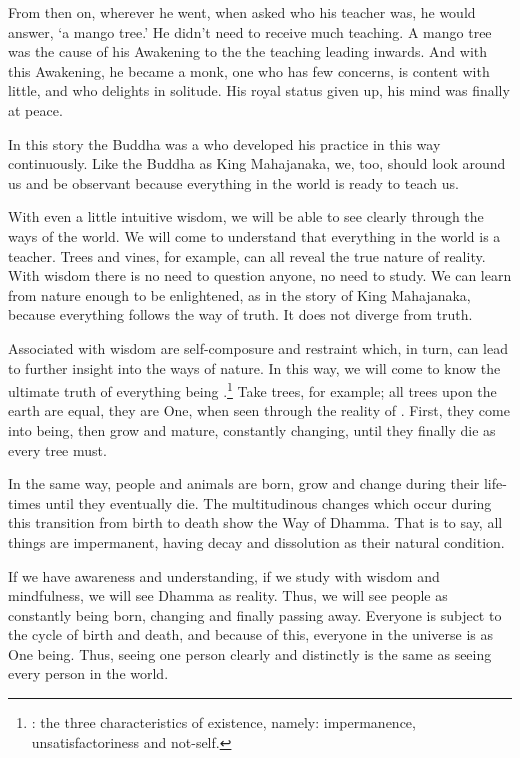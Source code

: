 From then on, wherever he went, when asked who his teacher was, he would answer, `a mango tree.' He didn't need to receive much teaching. A mango tree was the cause of his Awakening to the  the teaching leading inwards. And with this Awakening, he became a monk, one who has few concerns, is content with little, and who delights in solitude. His royal status given up, his mind was finally at peace. 

In this story the Buddha was a  who developed his practice in this way continuously. Like the Buddha as King Mahajanaka, we, too, should look around us and be observant because everything in the world is ready to teach us. 

With even a little intuitive wisdom, we will be able to see clearly through the ways of the world. We will come to understand that everything in the world is a teacher. Trees and vines, for example, can all reveal the true nature of reality. With wisdom there is no need to question anyone, no need to study. We can learn from nature enough to be enlightened, as in the story of King Mahajanaka, because everything follows the way of truth. It does not diverge from truth. 

Associated with wisdom are self-composure and restraint which, in turn, can lead to further insight into the ways of nature. In this way, we will come to know the ultimate truth of everything being .\footnote{: the three characteristics of existence, namely: impermanence, unsatisfactoriness and not-self.} Take trees, for example; all trees upon the earth are equal, they are One, when seen through the reality of . First, they come into being, then grow and mature, constantly changing, until they finally die as every tree must. 

In the same way, people and animals are born, grow and change during their life-times until they eventually die. The multitudinous changes which occur during this transition from birth to death show the Way of Dhamma. That is to say, all things are impermanent, having decay and dissolution as their natural condition. 

If we have awareness and understanding, if we study with wisdom and mindfulness, we will see Dhamma as reality. Thus, we will see people as constantly being born, changing and finally passing away. Everyone is subject to the cycle of birth and death, and because of this, everyone in the universe is as One being. Thus, seeing one person clearly and distinctly is the same as seeing every person in the world. 

